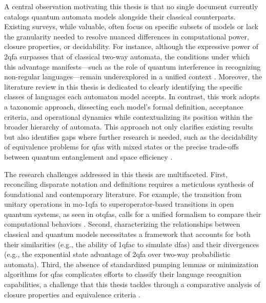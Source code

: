 A central observation motivating this thesis is that no single document currently catalogs quantum automata models alongside their classical counterparts. Existing surveys, while valuable, often focus on specific subsets of models or lack the granularity needed to resolve nuanced differences in computational power, closure properties, or decidability. For instance, although the expressive power of \gls{2qfa} surpasses that of classical two-way automata, the conditions under which this advantage manifests—such as the role of quantum interference in recognizing non-regular languages—remain underexplored in a unified context \cite{yakaryilmaz2010succinctness}. Moreover, the literature review in this thesis is dedicated to clearly identifying the specific classes of languages each automaton model accepts. In contrast, this work adopts a taxonomic approach, dissecting each model’s formal definition, acceptance criteria, and operational dynamics while contextualizing its position within the broader hierarchy of automata. This approach not only clarifies existing results but also identifies gaps where further research is needed, such as the decidability of equivalence problems for \glspl{qfa} with mixed states or the precise trade-offs between quantum entanglement and space efficiency \cite{hirvensalo2012quantum}.  

The research challenges addressed in this thesis are multifaceted. First, reconciling disparate notation and definitions requires a meticulous synthesis of foundational and contemporary literature. For example, the transition from unitary operations in \gls{mo-1qfa} to superoperator-based transitions in open quantum systems, as seen in \glspl{otqfa}, calls for a unified formalism to compare their computational behaviors \cite{bertoni2001quantum}. Second, characterizing the relationships between classical and quantum models necessitates a framework that accounts for both their similarities (e.g., the ability of \gls{1qfac} to simulate \glspl{dfa}) and their divergences (e.g., the exponential state advantage of \gls{2qfa} over two-way probabilistic automata). Third, the absence of standardized pumping lemmas or minimization algorithms for \glspl{qfa} complicates efforts to classify their language recognition capabilities, a challenge that this thesis tackles through a comparative analysis of closure properties and equivalence criteria \cite{ambainis1998one}.  


